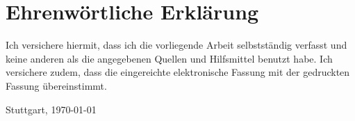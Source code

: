 \cleardoublepage
\chapter*{Ehrenwörtliche Erklärung}

Ich versichere hiermit, dass ich die vorliegende Arbeit selbstständig verfasst und 
keine anderen als die angegebenen Quellen und Hilfsmittel benutzt habe. Ich versichere zudem, dass die eingereichte elektronische 
Fassung mit der gedruckten Fassung übereinstimmt.

\vspace{3cm}
Stuttgart, \today \hspace{6cm} \DerAutorDerArbeit
{}

